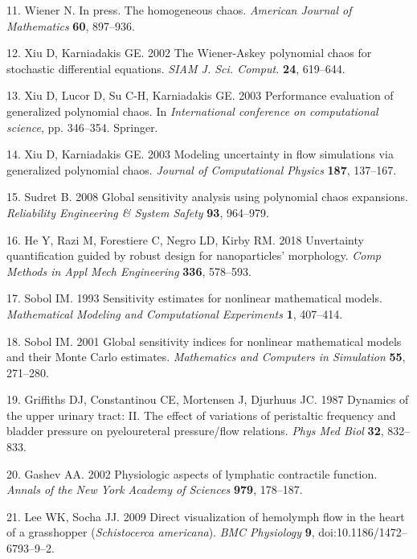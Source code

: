 \documentclass[
]{article}
\newenvironment{cslreferences}%
  {}%
  {\par}
\begin{document}
\begin{cslreferences}
\leavevmode\hypertarget{ref-Wiener:1938}{}%
11. Wiener N. In press. The homogeneous chaos. \emph{American Journal of
Mathematics} \textbf{60}, 897--936.

\leavevmode\hypertarget{ref-Xiu2002}{}%
12. Xiu D, Karniadakis GE. 2002 The Wiener-Askey polynomial chaos for
stochastic differential equations. \emph{SIAM J. Sci. Comput.}
\textbf{24}, 619--644.

\leavevmode\hypertarget{ref-XiuLucorK2003}{}%
13. Xiu D, Lucor D, Su C-H, Karniadakis GE. 2003 Performance evaluation
of generalized polynomial chaos. In \emph{International conference on
computational science}, pp. 346--354. Springer.

\leavevmode\hypertarget{ref-XiuK2003}{}%
14. Xiu D, Karniadakis GE. 2003 Modeling uncertainty in flow simulations
via generalized polynomial chaos. \emph{Journal of Computational
Physics} \textbf{187}, 137--167.

\leavevmode\hypertarget{ref-Sudret:2008}{}%
15. Sudret B. 2008 Global sensitivity analysis using polynomial chaos
expansions. \emph{Reliability Engineering \& System Safety} \textbf{93},
964--979.

\leavevmode\hypertarget{ref-He:2018}{}%
16. He Y, Razi M, Forestiere C, Negro LD, Kirby RM. 2018 Unvertainty
quantification guided by robust design for nanoparticles' morphology.
\emph{Comp Methods in Appl Mech Engineering} \textbf{336}, 578--593.

\leavevmode\hypertarget{ref-Sobol:1993}{}%
17. Sobol IM. 1993 Sensitivity estimates for nonlinear mathematical
models. \emph{Mathematical Modeling and Computational Experiments}
\textbf{1}, 407--414.

\leavevmode\hypertarget{ref-Sobol:2001}{}%
18. Sobol IM. 2001 Global sensitivity indices for nonlinear mathematical
models and their Monte Carlo estimates. \emph{Mathematics and Computers
in Simulation} \textbf{55}, 271--280.

\leavevmode\hypertarget{ref-Griffiths:1987}{}%
19. Griffiths DJ, Constantinou CE, Mortensen J, Djurhuus JC. 1987
Dynamics of the upper urinary tract: II. The effect of variations of
peristaltic frequency and bladder pressure on pyeloureteral
pressure/flow relations. \emph{Phys Med Biol} \textbf{32}, 832--833.

\leavevmode\hypertarget{ref-Gashev:2002}{}%
20. Gashev AA. 2002 Physiologic aspects of lymphatic contractile
function. \emph{Annals of the New York Academy of Sciences}
\textbf{979}, 178--187.

\leavevmode\hypertarget{ref-Lee:2009}{}%
21. Lee WK, Socha JJ. 2009 Direct visualization of hemolymph flow in the
heart of a grasshopper (\emph{Schistocerca americana}). \emph{BMC
Physiology} \textbf{9}, doi:10.1186/1472--6793--9--2.


\end{cslreferences}
\end{document}
